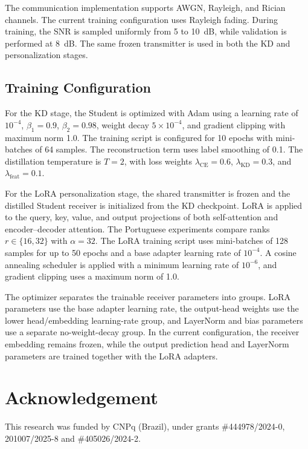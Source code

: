 \documentclass[conference]{IEEEtran}
\begin{document}
The communication implementation supports AWGN, Rayleigh, and Rician channels. The current training configuration uses Rayleigh fading. During training, the SNR is sampled uniformly from 5 to 10~dB, while validation is performed at 8~dB. The same frozen transmitter is used in both the KD and personalization stages.

\subsection{Training Configuration}

For the KD stage, the Student is optimized with Adam using a learning rate of $10^{-4}$, $\beta_1=0.9$, $\beta_2=0.98$, weight decay $5\times10^{-4}$, and gradient clipping with maximum norm 1.0. The training script is configured for 10 epochs with mini-batches of 64 samples. The reconstruction term uses label smoothing of 0.1. The distillation temperature is $T=2$, with loss weights $\lambda_{\mathrm{CE}}=0.6$, $\lambda_{\mathrm{KD}}=0.3$, and $\lambda_{\mathrm{feat}}=0.1$.

For the LoRA personalization stage, the shared transmitter is frozen and the distilled Student receiver is initialized from the KD checkpoint. LoRA is applied to the query, key, value, and output projections of both self-attention and encoder--decoder attention. The Portuguese experiments compare ranks $r\in\{16,32\}$ with $\alpha=32$. The LoRA training script uses mini-batches of 128 samples for up to 50 epochs and a base adapter learning rate of $10^{-4}$. A cosine annealing scheduler is applied with a minimum learning rate of $10^{-6}$, and gradient clipping uses a maximum norm of 1.0.

The optimizer separates the trainable receiver parameters into groups. LoRA parameters use the base adapter learning rate, the output-head weights use the lower head/embedding learning-rate group, and LayerNorm and bias parameters use a separate no-weight-decay group. In the current configuration, the receiver embedding remains frozen, while the output prediction head and LayerNorm parameters are trained together with the LoRA adapters.

\section*{Acknowledgement}
This research was funded by CNPq (Brazil), under grants \#444978/2024-0, 201007/2025-8 and \#405026/2024-2.





\end{document}
